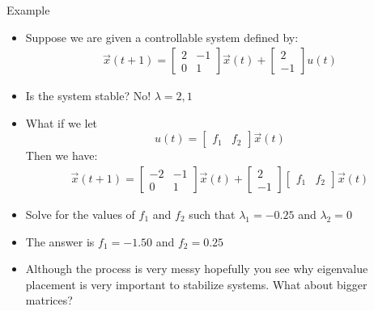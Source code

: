 \documentclass{beamer}
\begin{document}
	\begin{frame}{Example}
	\begin{itemize}
	    \item Suppose we are given a controllable system defined by: 
	        \begin{align*}
	            \vec{x}(t+1) = \begin{bmatrix} 2&-1 \\
	            0&1
	            \end{bmatrix} \vec{x}(t) + \begin{bmatrix} 2 \\ -1 \end{bmatrix}u(t)
	        \end{align*}
	    \item Is the system stable? \pause No! $\lambda = 2, 1$
	    \item What if we let \[ u(t) = \begin{bmatrix} f_1 & f_2 \end{bmatrix}\vec{x}(t)\]  Then we have:   
	        \begin{align*}
	            \vec{x}(t+1) = \begin{bmatrix} -2 & -1 \\
	            0&1
	            \end{bmatrix}\vec{x}(t) + \begin{bmatrix} 2 \\ -1 \end{bmatrix}\begin{bmatrix} f_1 & f_2 \end{bmatrix}\vec{x}(t) 
	        \end{align*}
	    \item Solve for the values of $f_1$ and $f_2$ such that $\lambda_1 = -0.25$ and $\lambda_2 = 0$ \pause
	    \item The answer is $f_1 = -1.50$ and $f_2 = 0.25$ \pause
	    \item Although the process is very messy hopefully you see why eigenvalue placement is very important to stabilize systems. What about bigger matrices?
	\end{itemize}
	\end{frame}
\end{document}
